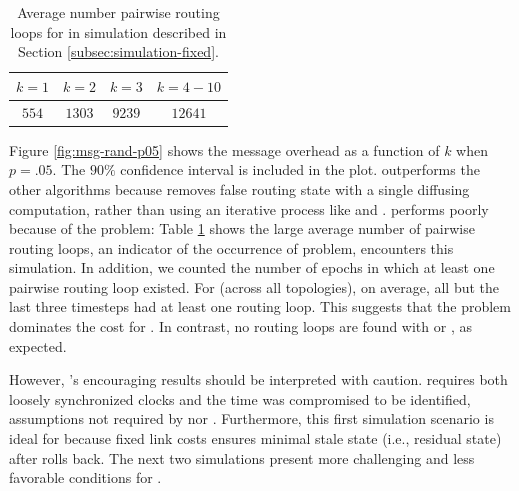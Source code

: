 \begin{table}
\begin{center}
\begin{tabular}{|c|c|c|c|}
\hline
  $k=1$ & $k=2$ & $k=3$ & $k=4-10$ \\
\hline
  $554$ & $1303$ & $9239$ &  $12641$ \\
\hline
\end{tabular}
\end{center}
\caption{Average number pairwise routing loops for \second in simulation described in Section \ref{subsec:simulation-fixed}.} 
\label{tab:loop1}
\end{table}


Figure \ref{fig:msg-rand-p05} shows the message overhead as a function of $k$ when $p=.05$. The $90 \%$ confidence interval is included in the plot.
\cpr outperforms the other algorithms because \cpr removes false routing state with a single diffusing computation, rather than using an iterative process like \second and \purges. 
\second performs poorly because of the \infinity problem: 
Table \ref{tab:loop1} shows the large average number of pairwise routing loops, an indicator of the occurrence of \infinity problem, \second encounters this simulation.
In addition, we counted the number of epochs in which at least one pairwise routing loop existed.  For \second (across all topologies), on average, all but the last three 
timesteps had at least one routing loop.  This suggests that the \infinity problem dominates the cost for \seconds. 
In contrast, no routing loops are found with \purge or \cprs, as expected.


However, \cprs's encouraging results should be interpreted with caution.
\cpr requires both loosely synchronized clocks and the time \bad was compromised to be identified, assumptions not required by \second nor \purges.  
Furthermore, this first simulation scenario is ideal for \cpr because fixed link costs ensures minimal stale state (i.e., residual \oldvector state)
after \cpr rolls back.  The next two simulations present more challenging and less favorable conditions for \cprs.





